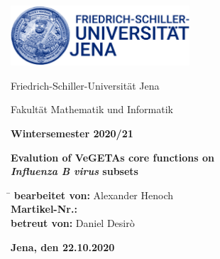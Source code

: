\begin{titlepage}
    
    \centering 
    \includegraphics[width=0.5\textwidth]{Figures/Logo.jpg}
    
    \vfill
    
    {\large Friedrich-Schiller-Universität Jena}
      
    {\large Fakultät Mathematik und Informatik}
            
    {\large \textbf{Wintersemester 2020/21}}
    
    \vspace{3cm}
        
    {\large \textbf{Evalution of VeGETAs core functions on \\\textit{Influenza B virus} subsets}}
    
    \vspace{3cm}
    
    \flushleft
    
    \begin{nstabbing}
        \hspace{0.25\textwidth} \= \kill
        \textbf{bearbeitet von:} \> Alexander Henoch\\
        \textbf{Martikel-Nr.:} \\
        \textbf{betreut von:} \> Daniel Desirò
    \end{nstabbing}
    
    \vspace{3cm}
    
    \textbf{Jena, den 22.10.2020}
    
\end{titlepage}